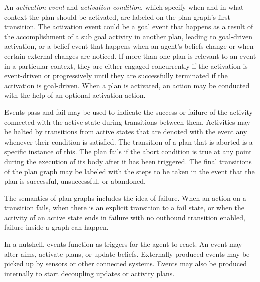 \begin{itemize}
\begin{itemize}[label={}]
        \vspace{.5cm}
        
        \begin{itemize}[label={}]
        An \textit{activation event} and \textit{activation condition}, which specify when and in what context the plan should be activated, are labeled on the plan graph's first transition. The activation event could be a goal event that happens as a result of the accomplishment of a sub goal activity in another plan, leading to goal-driven activation, or a belief event that happens when an agent's beliefs change or when certain external changes are noticed. If more than one plan is relevant to an event in a particular context, they are either engaged concurrently if the activation is event-driven or progressively until they are successfully terminated if the activation is goal-driven. When a plan is activated, an action may be conducted with the help of an optional activation action.
        
        \vspace{.5cm}
        
        Events pass and fail may be used to indicate the success or failure of the activity connected with the active state during transitions between them. Activities may be halted by transitions from active states that are denoted with the event any whenever their condition is satisfied. The transition of a plan that is aborted is a specific instance of this. The plan fails if the abort condition is true at any point during the execution of its body after it has been triggered. The final transitions of the plan graph may be labeled with the steps to be taken in the event that the plan is successful, unsuccessful, or abandoned.
        
        \vspace{.5cm}
        
        The semantics of plan graphs includes the idea of failure. When an action on a transition fails, when there is an explicit transition to a fail state, or when the activity of an active state ends in failure with no outbound transition enabled, failure inside a graph can happen.
        \end{itemize}
    \end{itemize}
    
    \vspace{.5cm}
    
    In a nutshell, events function as triggers for the agent to react. An event may alter aims, activate plans, or update beliefs. Externally produced events may be picked up by sensors or other connected systems. Events may also be produced internally to start decoupling updates or activity plans.
\end{itemize}

